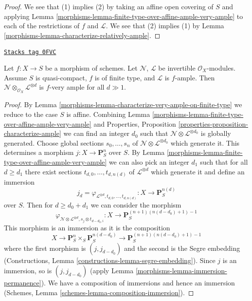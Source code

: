\begin{proof}

We see that (1) implies (2) by taking an affine open covering of $S$
and applying Lemma \ref{morphisms-lemma-finite-type-over-affine-ample-very-ample} to
each of the restrictions of $f$ and
$\mathcal{L}$. We see that (2) implies (1) by
Lemma \ref{morphisms-lemma-characterize-relatively-ample}.
\end{proof}

\begin{lemma}
\label{morphisms-lemma-invertible-add-enough-ample-very-ample}
\href{https://stacks.math.columbia.edu/tag/0FVC}{\texttt{Stacks tag 0FVC}}

Let $f : X \to S$ be a morphism of schemes.
Let $\mathcal{N}$, $\mathcal{L}$ be invertible $\mathcal{O}_X$-modules.
Assume $S$ is quasi-compact, $f$ is of finite type, and $\mathcal{L}$
is $f$-ample. Then
$\mathcal{N} \otimes_{\mathcal{O}_X} \mathcal{L}^{\otimes d}$
is $f$-very ample for all $d \gg 1$.
\end{lemma}

\begin{proof}

By Lemma \ref{morphisms-lemma-characterize-very-ample-on-finite-type}
we reduce to the case $S$ is affine. Combining
Lemma \ref{morphisms-lemma-finite-type-over-affine-ample-very-ample} and
Properties, Proposition \ref{properties-proposition-characterize-ample}
we can find an integer $d_0$ such that
$\mathcal{N} \otimes \mathcal{L}^{\otimes d_0}$
is globally generated. Choose global sections
$s_0, \ldots, s_n$ of $\mathcal{N} \otimes \mathcal{L}^{\otimes d_0}$
which generate it. This determines a morphism
$j : X \to \mathbf{P}^n_S$ over $S$. By
Lemma \ref{morphisms-lemma-finite-type-over-affine-ample-very-ample}
we can also pick an integer $d_1$ such that for all $d \geq d_1$
there exist sections $t_{d, 0}, \ldots, t_{d, n(d)}$
of $\mathcal{L}^{\otimes d}$ which generate it and define
an immersion
$$
j_d = \varphi_{\mathcal{L}^{\otimes d}, t_{d, 0}, \ldots, t_{d, n(d)}} :
X
\longrightarrow
\mathbf{P}^{n(d)}_S
$$
over $S$. Then for $d \geq d_0 + d_1$ we can consider the
morphism
$$
\varphi_{\mathcal{N} \otimes \mathcal{L}^{\otimes d},
s_j \otimes t_{d - d_0, i}} :
X
\longrightarrow
\mathbf{P}^{(n + 1)(n(d - d_0) + 1) - 1}_S
$$
This morphism is an immersion as it is the composition
$$
X \to \mathbf{P}^n_S \times_S \mathbf{P}^{n(d - d_0)}_S
\to \mathbf{P}^{(n + 1)(n(d - d_0) + 1) - 1}_S
$$
where the first morphism is $(j, j_{d - d_0})$ and
the second is the Segre embedding
(Constructions, Lemma \ref{constructions-lemma-segre-embedding}).
Since $j$ is an immersion, so is $(j, j_{d - d_0})$
(apply Lemma \ref{morphisms-lemma-immersion-permanence}). We have a composition of
immersions and hence an immersion
(Schemes, Lemma \ref{schemes-lemma-composition-immersion}).
\end{proof}

